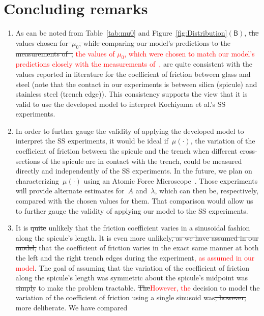 \documentclass[preprint,10pt,times]{elsarticle}
\numberwithin{equation}{section}
\newcommand{\pr}[1]{\left( #1 \right)}
\newcommand{\subf}[1]{\pr{\textsf{#1}}}
\begin{document}
\section{Concluding remarks\label{sec:Remark}}
\begin{enumerate}
\item As can be noted from Table~\ref{tab:mu0} and Figure~\ref{fig:Distribution}$\subf{B}$, \sout{
the values chosen for~$\mu_0$, while comparing our model's predictions
to the measurements of~\cite{Sayaka2021Sawtooth},} \textcolor{red}{the values of $\mu_0$, which were chosen to match our model's predictions closely with the measurements of~\cite{Sayaka2021Sawtooth},} are quite
consistent with the values reported in literature for the coefficient
of friction between glass and steel (note that the contact in our
experiments is between silica (spicule) and stainless steel (trench
edge)). This consistency supports the view that it is valid to use
the developed model to interpret Kochiyama et al.'s SS experiments.
\item In order to further gauge the validity of applying the developed model
to interpret the SS experiments, it would be ideal if~$\mu(\cdot)$,
the variation of the coefficient of friction between the spicule and
the trench when different cross-sections of the spicule are in contact
with the trench, could be measured directly and independently of the
SS experiments. In the future, we plan on characterizing~$\mu(\cdot)$
using an Atomic Force Microscope~\cite{kesari2010role,kesari2011effective,deng2019depth}.
Those experiments will provide alternate estimates for~$A$ and~$\lambda$,
which can then be, respectively, compared with the chosen values for
them. That comparison would allow us to further gauge the validity
of applying our model to the SS experiments.
\item It is \sout{quite} unlikely that the friction coefficient varies in a sinusoidal
fashion along the spicule's length. It is even more unlikely\sout{, as we
have assumed in our model,} that the coefficient of friction varies
in the exact same manner at both the left and the right trench edges
during the experiment\textcolor{red}{, as assumed in our model}. The goal of assuming that the variation of
the coefficient of friction along the spicule's length was symmetric
about the spicule's midpoint was \sout{simply }to make the problem tractable.
\sout{The}\textcolor{red}{However, the} decision to model the variation of the coefficient of friction
using a single sinusoid was\sout{, however,} more deliberate. We have compared

\end{enumerate}
\end{document}
